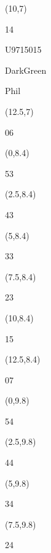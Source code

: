 \documentclass[a4paper]{article}
\newcommand{\myseat}[4]{%
\vspace{-0.1cm}
\parbox[t][2.2cm][t]{3.5cm}{
\small #1 %
\begin{description}
\vspace{-0.1cm}
\item [ID:] #2
\vspace{-0.1cm}
\item [Team:] #3 \normalsize
\vspace{-0.1cm}
\item \normalsize #4
\vspace{-0.1cm}
\end{description}
}
}
\begin{document}
\begin{CJK}{UTF8}{cyberbit}
\begin{textblock}{2.5}(10,7)
\myseat{14}{U9715015}{DarkGreen}{Phil}
\end{textblock}

\begin{textblock}{2.5}(12.5,7)
\textblockcolor{}
\myseat{06}{}{}{}
\end{textblock}

\begin{textblock}{2.5}(0,8.4)
\textblockcolor{}
\myseat{53}{}{}{}
\end{textblock}

\begin{textblock}{2.5}(2.5,8.4)
\textblockcolor{}
\myseat{43}{}{}{}
\end{textblock}

\begin{textblock}{2.5}(5,8.4)
\textblockcolor{}
\myseat{33}{}{}{}
\end{textblock}

\begin{textblock}{2.5}(7.5,8.4)
\textblockcolor{}
\myseat{23}{}{}{}
\end{textblock}

\begin{textblock}{2.5}(10,8.4)
\textblockcolor{}
\myseat{15}{}{}{}
\end{textblock}

\begin{textblock}{2.5}(12.5,8.4)
\textblockcolor{}
\myseat{07}{}{}{}
\end{textblock}

\begin{textblock}{2.5}(0,9.8)
\textblockcolor{}
\myseat{54}{}{}{}
\end{textblock}

\begin{textblock}{2.5}(2.5,9.8)
\textblockcolor{}
\myseat{44}{}{}{}
\end{textblock}

\begin{textblock}{2.5}(5,9.8)
\textblockcolor{}
\myseat{34}{}{}{}
\end{textblock}

\begin{textblock}{2.5}(7.5,9.8)
\textblockcolor{}
\myseat{24}{}{}{}
\end{textblock}


\end{CJK}
\end{document}
